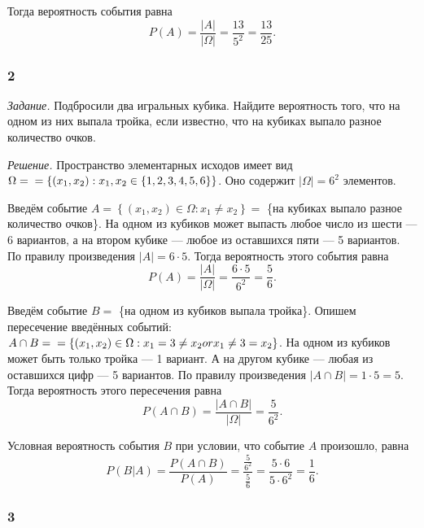 Тогда вероятность события равна
$$P \left( A \right) =
\frac{ \left| A \right| }{ \left| \Omega \right| } =
\frac{13}{5^2} =
\frac{13}{25}.$$

\subsubsection*{2}

\textit{Задание.} Подбросили два игральных кубика.
Найдите вероятность того, что на одном из них выпала тройка, если известно, что на кубиках выпало разное количество очков.

\textit{Решение.}
Пространство элементарных исходов имеет вид $ \Omega =  \\
= \left\{ \left( x_1, x_2 \right): x_1, x_2 \in \left\{ 1, 2, 3, 4, 5, 6\right\} \right\} $.
Оно содержит $ \left| \Omega \right| = 6^2$ элементов.

Введём событие $A = \left\{ \left( x_1, x_2 \right) \in \Omega: x_1 \neq x_2 \right\} =$ \{на кубиках выпало разное количество очков\}.
На одном из кубиков может выпасть любое число из шести --- 6 вариантов, а на втором кубике --- любое из оставшихся пяти --- 5 вариантов.
По правилу произведения $ \left| A \right| = 6 \cdot 5$.
Тогда вероятность этого события равна
$$P \left( A \right) =
\frac{ \left| A \right| }{ \left| \Omega \right| } =
\frac{6 \cdot 5}{6^2} =
\frac{5}{6}.$$

Введём событие $B = $ \{на одном из кубиков выпала тройка\}.
Опишем пересечение введённых событий: $A \cap B =  \\
= \left\{ \left( x_1, x_2 \right) \in \Omega: x_1 = 3 \neq x_2 or x_1 \neq 3 = x_2 \right\} $.
На одном из кубиков может быть только тройка --- 1 вариант.
А на другом кубике --- любая из оставшихся цифр --- 5 вариантов.
По правилу произведения $ \left| A \cap B \right| = 1 \cdot 5 = 5$.
Тогда вероятность этого пересечения равна
$$P \left( A \cap B \right) =
\frac{ \left| A \cap B \right| }{ \left| \Omega \right| } =
\frac{5}{6^2}.$$

Условная вероятность события $B$ при условии, что событие $A$ произошло, равна
$$P \left( \left. B \right| A \right) =
\frac{P \left( A \cap B \right) }{P \left( A \right) } =
\frac{ \frac{5}{6^2} }{ \frac{5}{6} } =
\frac{5 \cdot 6}{5 \cdot 6^2} =
\frac{1}{6}.$$

\subsubsection*{3}

